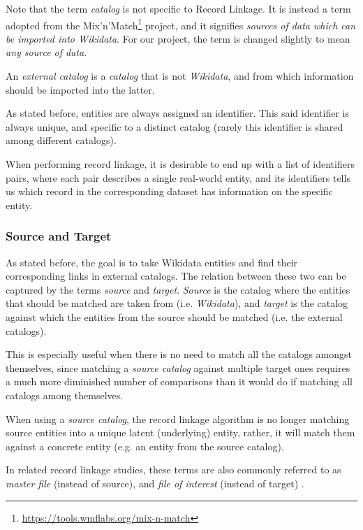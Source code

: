 \documentclass[epsfig,a4paper,11pt,titlepage,twoside,openany]{book}
\newcommand{\footurl}[1]{\footnote{\url{#1}}}
\begin{document}
Note that the term \textit{catalog} is not specific to Record Linkage. It is instead a term adopted from the Mix'n'Match\footurl{https://tools.wmflabs.org/mix-n-match} project, and it signifies \textit{sources of data which can be imported into Wikidata}. For our project, the term is changed slightly to mean \textit{any source of data}. 

An \textit{external catalog} is a \textit{catalog} that is not \textit{Wikidata}, and from which information should be imported into the latter.

As stated before, entities are always assigned an identifier. This said identifier is always unique, and specific to a distinct catalog (rarely this identifier is shared among different catalogs). 

When performing record linkage, it is desirable to end up with a list of identifiers pairs, where each pair describes a single real-world entity, and its identifiers tells us which record in the corresponding dataset has information on the specific entity.


\subsubsection{Source and Target}
\label{sec:rl-term-source-and-target}

As stated before, the goal is to take Wikidata entities and find their corresponding links in external catalogs. The relation between these two can be captured by the terms \textit{source} and \textit{target}. \textit{Source} is the catalog where the entities that should be matched are taken from (i.e. \textit{Wikidata}), and \textit{target} is the catalog against which the entities from the source should be matched (i.e. the external catalogs).

This is especially useful when there is no need to match all the catalogs amongst
themselves, since matching a \textit{source catalog} against multiple target ones
requires a much more diminished number of comparisons than it would do if matching all catalogs among themselves.

When using a \textit{source catalog}, the record linkage algorithm is no longer matching
source entities into a unique latent (underlying) entity, rather, it will match
them against a concrete entity (e.g. an entity from the source catalog).

In related record linkage studies, these terms are also commonly referred to as \cite{Sayers2015}
\textit{master file} (instead of source), and \textit{file of interest} (instead
of target) .
   
\end{document}
